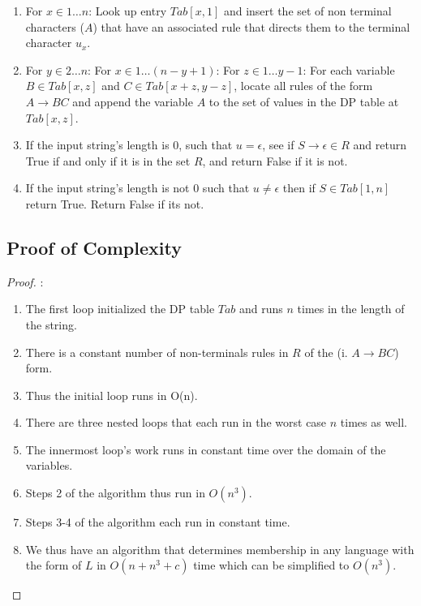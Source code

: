 \documentclass{article}
\begin{document}
\begin{enumerate}
      \item For $x \in 1\ldots n$:
            \subitem Look up entry $Tab[x, 1]$ and insert the set of non terminal characters ($A$)
            that have an associated rule that directs them to the terminal character $u_x$.
      \item For $y \in 2\ldots n$:
            \subitem For $x \in 1\ldots(n-y+1)$:
            \subsubitem For $z \in 1\ldots y-1$:
            \subsubitem \hspace*{6mm} For each variable $B \in Tab[x, z]$ and $C \in
                  Tab[x+z, y-z]$, locate all rules of the form $A \rightarrow BC$ and append
            the variable $A$ to the set of values in the DP table at $Tab[x,z]$.
      \item If the input string's length is 0, such that $u=\epsilon$, see if $S \rightarrow
                  \epsilon \in R$ and return True if and only if it is in the set $R$, and
            return False if it is not.
      \item If the input string's length is not 0 such that $u \neq \epsilon$ then if $S \in
                  Tab[1, n]$ return True. Return False if its not.
\end{enumerate}

\subsection{Proof of Complexity}

\begin{proof}:

      \begin{enumerate}

            \item
                  The first loop initialized the DP table $Tab$ and runs $n$ times in the length of the string.
            \item
                  There is a constant number of
                  non-terminals rules in $R$ of the (i. $A\rightarrow BC$) form.
            \item Thus the initial loop runs in O(n).
            \item
                  There are three nested loops that each run in the worst case $n$ times
                  as well.
            \item
                  The innermost loop's work runs in constant time over the domain of the
                  variables.
            \item Steps 2 of the algorithm thus run in $O(n^3)$.
            \item Steps 3-4 of the algorithm each run in constant time.
            \item
                  We thus have an algorithm that determines membership in any language with the form of $L$
                  in $O(n + n^3 + c)$ time which can be simplified to $O(n^3)$.
      \end{enumerate}
\end{proof}
\end{document}

